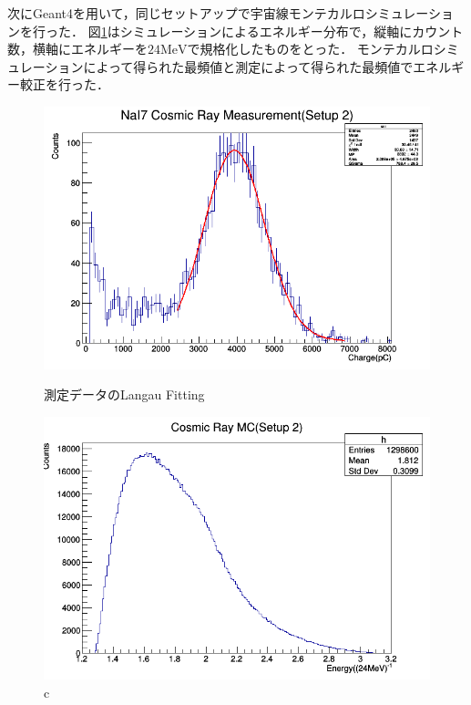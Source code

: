 次にGeant4を用いて，同じセットアップで宇宙線モンテカルロシミュレーションを行った．
図\ref{MC2}はシミュレーションによるエネルギー分布で，縦軸にカウント数，横軸にエネルギーを$24\mathrm{MeV}$で規格化したものをとった．
モンテカルロシミュレーションによって得られた最頻値と測定によって得られた最頻値でエネルギー較正を行った．

\begin{figure}[H]
  \begin{minipage}{0.45\hsize}
    \begin{center}\hspace*{-1em}
  \includegraphics[width=1\textwidth]{figure/tajima/NaI7_Setup2.png}
      \caption{測定データのLangau Fitting}\label{langau}
    \end{center}
  \end{minipage}\hfill
  \begin{minipage}{0.45\hsize}
    \begin{center}
      \includegraphics[width=1\textwidth]{figure/tajima/MC2.png}
      \caption{c}\label{MC2}
    \end{center}
  \end{minipage}
\end{figure}

